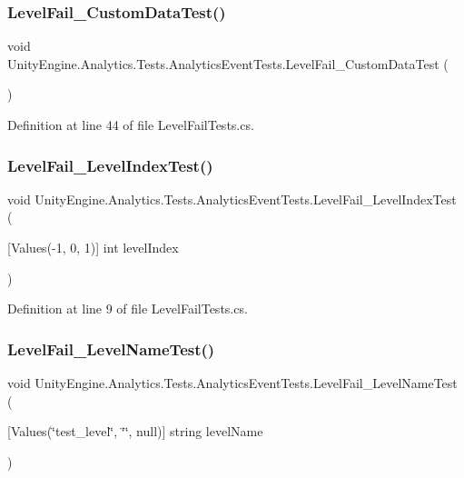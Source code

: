 \subsubsection{\texorpdfstring{LevelFail\_CustomDataTest()}{LevelFail\_CustomDataTest()}}
{\footnotesize\ttfamily void Unity\+Engine.\+Analytics.\+Tests.\+Analytics\+Event\+Tests.\+Level\+Fail\+\_\+\+Custom\+Data\+Test (\begin{DoxyParamCaption}{ }\end{DoxyParamCaption})}



Definition at line 44 of file Level\+Fail\+Tests.\+cs.

\mbox{\label{class_unity_engine_1_1_analytics_1_1_tests_1_1_analytics_event_tests_af8a5ce085f481179bbffd19e5a451d82}} 
\subsubsection{\texorpdfstring{LevelFail\_LevelIndexTest()}{LevelFail\_LevelIndexTest()}}
{\footnotesize\ttfamily void Unity\+Engine.\+Analytics.\+Tests.\+Analytics\+Event\+Tests.\+Level\+Fail\+\_\+\+Level\+Index\+Test (\begin{DoxyParamCaption}\item[{\mbox{[}\+Values(-\/1, 0, 1)\mbox{]} int}]{level\+Index }\end{DoxyParamCaption})}



Definition at line 9 of file Level\+Fail\+Tests.\+cs.

\mbox{\label{class_unity_engine_1_1_analytics_1_1_tests_1_1_analytics_event_tests_a859fd8465a51a694a514f3de2d5d6abf}} 
\subsubsection{\texorpdfstring{LevelFail\_LevelNameTest()}{LevelFail\_LevelNameTest()}}
{\footnotesize\ttfamily void Unity\+Engine.\+Analytics.\+Tests.\+Analytics\+Event\+Tests.\+Level\+Fail\+\_\+\+Level\+Name\+Test (\begin{DoxyParamCaption}\item[{\mbox{[}\+Values(\char`\"{}test\+\_\+level\char`\"{}, \char`\"{}\char`\"{}, null)\mbox{]} string}]{level\+Name }\end{DoxyParamCaption})}




